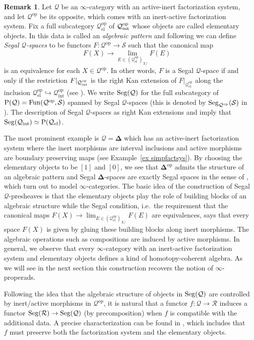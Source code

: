 \documentclass{amsart}
\numberwithin{theorem}{subsection}
\theoremstyle{definition}
\newtheorem{remark}[theorem]{Remark}
\providecommand{\op}{\mathrm{op}}
\providecommand{\xel}{\mathrm{el}}
\providecommand{\xint}{\mathrm{int}}
\newcommand{\xFun}{\operatorname{Fun}}
\newcommand{\xS}{\mathcal{S}}
\newcommand{\Pre}{\name{P}}
\newcommand{\name}[1]{\ensuremath{\text{\textup{#1}}}}
\newcommand{\simp}{\mathbf{\Delta}}
\newcommand{\Seg}{\name{Seg}}
\begin{document}
\begin{remark}\label{rem algpatt}
	Let $\mathcal Q$ be an $\infty$-category with an active-inert factorization system, and let $\mathcal Q^\op$ be its opposite, which comes with an inert-active factorization system.
	Fix a full subcategory $\mathcal Q^\op_\xel$ of $\mathcal Q^\op_{\name{int}}$ whose objects are called elementary objects. 
	In \cite{patterns1} this data is called an \emph{algebraic pattern} and following \cite[Definition 2.7]{patterns1} we can define \emph{Segal $\mathcal{Q}$-spaces} to be functors $F\colon \mathcal Q^\op \to \xS$ such that the canonical map 
	\[F(X)\to \lim_{E\in (\mathcal Q^{\op}_{\xel})_{X/}}	F(E)\]
	is an equivalence for each $X\in \mathcal Q^\op$. 
	In other words, $F$ is a Segal $\mathcal Q$-space if and only if the restriction $F|_{\mathcal Q^\op_{\name{int}}}$ is the right Kan extension of $F|_{\mathcal Q^\op_\xel}$ along the inclusion $\mathcal Q^{\op}_{\xel}\hookrightarrow \mathcal Q^{\op}_{\xint}$ (see \cite[Lemma 2.9]{patterns1}). 
	We write $\Seg(\mathcal Q)$ for the full subcategory of $\Pre(\mathcal Q) = \xFun(\mathcal Q^\op, \xS)$ spanned by Segal $\mathcal Q$-spaces (this is denoted by $\Seg_{\mathcal{Q}^\op}(\xS)$ in \cite{patterns1}).
	The description of Segal $\mathcal Q$-spaces as right Kan extensions and \cite[Proposition 4.3.2.15]{ht} imply that $\Seg(\mathcal Q_{\xint})\simeq \Pre(\mathcal Q_{\xel})$.
	
	The most prominent example is $\mathcal Q=\simp$ which has an active-inert factorization system where the inert morphisms are interval inclusions and active morphisms are boundary preserving maps (see Example~\ref{ex simpfactsys}). 
	By choosing the elementary objects to be $[1]$ and $[0]$, we see that $\simp^\op$ admits the structure of an algebraic pattern and Segal $\simp$-spaces are exactly Segal spaces in the sense of \cite{Rezk}, which turn out to model $\infty$-categories. 
	The basic idea of the construction of Segal $\mathcal Q$-presheaves is that the elementary objects play the role of building blocks of an algebraic structure while the Segal condition, i.e.\ the requirement that the canonical maps $F(X)\to \lim_{E\in (\mathcal Q^\op_{\xel})_{X/}} F(E)$ are equivalences, says that every space $F(X)$ is given by gluing these building blocks along inert morphisms. 
	The algebraic operations such as compositions are induced by active morphisms. 
	In general, we observe that every $\infty$-category with an inert-active factorization system and elementary objects defines a kind of homotopy-coherent algebra. 
	As we will see in the next section this construction recovers the notion of $\infty$-properads.
	
	Following the idea that the algebraic structure of objects in $\Seg(\mathcal Q)$ are controlled by inert/active morphisms in $\mathcal Q^\op$, it is natural that a functor $f\colon \mathcal Q\to \mathcal R$ induces a functor $\Seg(\mathcal R)\to \Seg(\mathcal Q)$ (by precomposition) when $f$ is compatible with the additional data.
	A precise characterization can be found in \cite[Lemma 4.5]{patterns1}, which includes that $f$ must preserve both the factorization system and the elementary objects.
\end{remark}
\end{document}
